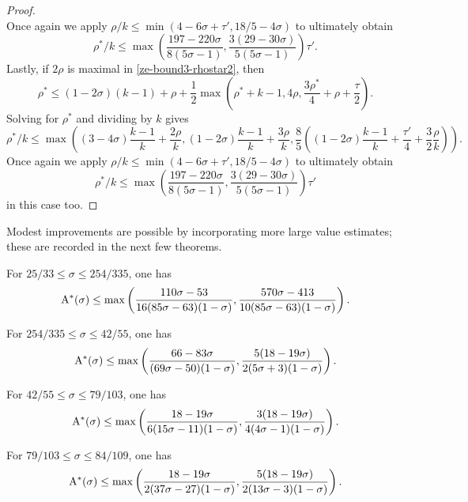 \begin{proof}
\[\]
Once again we apply $\rho/k \le \min(4 - 6\sigma + \tau', 18/5 - 4\sigma)$ to ultimately obtain
\[
\rho^*/k \le \max\left(\frac{197 - 220\sigma}{8(5\sigma - 1)}, \frac{3(29 - 30\sigma)}{5(5\sigma - 1)}\right)\tau'.
\]
Lastly, if $2\rho$ is maximal in \eqref{ze-bound3-rhostar2}, then
\[
\rho^* \le (1 - 2\sigma)(k - 1) + \rho + \frac{1}{2}\max(\rho^*+k - 1, 4\rho, \frac{3\rho^*}{4} + \rho+\frac{\tau}{2}).
\]
Solving for $\rho^*$ and dividing by $k$ gives
\[
\rho^*/k \le \max((3 - 4\sigma)\frac{k - 1}{k} + \frac{2\rho}{k}, (1 - 2\sigma)\frac{k - 1}{k} + \frac{3\rho}{k}, \frac{8}{5}((1 - 2\sigma)\frac{k - 1}{k} + \frac{\tau'}{4} + \frac{3}{2}\frac{\rho}{k})).
\]
Once again we apply $\rho/k \le \min(4 - 6\sigma + \tau', 18/5 - 4\sigma)$ to ultimately obtain
\[
\rho^*/k \le \max\left(\frac{197 - 220\sigma}{8(5\sigma - 1)}, \frac{3(29 - 30\sigma)}{5(5\sigma - 1)}\right)\tau'
\]
in this case too.
\end{proof}

Modest improvements are possible by incorporating more large value estimates; these are recorded in the next few theorems.

\begin{theorem}\label{imp-energy-bound4}
For $25/33 \le \sigma \le 254/335$, one has
\[
\mathrm{A}^*(\sigma)\le \max\left(\frac{110\sigma - 53}{16(85\sigma - 63)(1 - \sigma)}, \frac{570\sigma - 413}{10(85\sigma - 63)(1 - \sigma)}\right).
\]
\end{theorem}
\derived
{}

\begin{theorem}\label{imp-energy-bound5}
For $254/335 \le \sigma \le 42/55$, one has
\[
\mathrm{A}^*(\sigma) \le \max\left(\frac{66 - 83\sigma}{(69\sigma - 50)(1 - \sigma)}, \frac{5(18 - 19\sigma)}{2(5\sigma + 3)(1 - \sigma)}\right).
\]
\end{theorem}
\derived
{}

\begin{theorem}\label{imp-energy-bound6}
For $42/55 \le \sigma \le 79/103$, one has
\[
\mathrm{A}^*(\sigma) \le \max\left(\frac{18 - 19\sigma}{6(15\sigma - 11)(1- \sigma)}, \frac{3(18-19\sigma)}{4(4\sigma-1)(1 - \sigma)}\right).
\]
\end{theorem}
\derived
{}

\begin{theorem}\label{imp-energy-bound7}
For $79/103 \le \sigma \le 84/109$, one has
\[
\mathrm{A}^*(\sigma) \le \max\left(\frac{18 - 19\sigma}{2(37\sigma - 27)(1 - \sigma)}, \frac{5(18 - 19\sigma)}{2(13\sigma - 3)(1 - \sigma)}\right).
\]
\end{theorem}
\derived
{}

